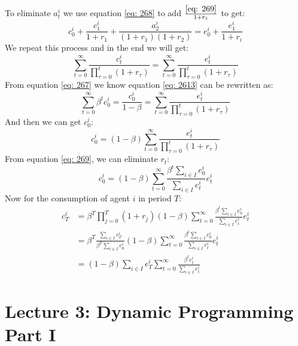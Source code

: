 \documentclass{article}
\begin{document}
To eliminate $a^i_t$ we use equation \eqref{eq: 268} to add $\frac{\eqref{eq: 269}}{1 + r_1}$ to get:
\begin{equation}
	c^i_0 + \frac{c^i_1}{1 + r_1} + \frac{a^i_2}{(1 + r_1)(1 + r_2)} = e^i_0 + \frac{e^i_1}{1 + r_i}
\end{equation} 
We repeat this process and in the end we will get:
\begin{equation}
	\sum\limits^\infty_{t=0} \frac{c^i_t}{\prod\limits^t_{\tau=0}(1 + r_\tau)} = \sum\limits^\infty_{t=0} \frac{e^i_t}{\prod\limits^t_{\tau=0}(1 + r_\tau)} \label{eq: 2613}
\end{equation}
From equation \eqref{eq: 267} we know equation \eqref{eq: 2613} can be rewritten as:
\begin{equation}
	\sum\limits^\infty_{t=0} \beta^t c^i_0 = \frac{c^i_0}{1 - \beta} = \sum\limits^\infty_{t=0} \frac{e^i_t}{\prod\limits^t_{\tau=0}(1 + r_\tau)}
\end{equation}
And then we can get $c^i_0$:
\begin{equation}
	c^i_0 = (1 - \beta) \sum\limits^\infty_{t=0} \frac{e^i_t}{\prod\limits^t_{\tau=0}(1 + r_\tau)}
\end{equation}
From equation \eqref{eq: 269}, we can eliminate $r_t$:
\begin{equation}
	c^i_0 = (1 - \beta) \sum\limits^\infty_{t=0} \frac{\beta^t \sum_{i \in I} e^i_0}{\sum_{i \in I} e^i_t} e^i_t
\end{equation}
Now for the consumption of agent $i$ in period $T$:
\begin{align}
	c^i_T &= \beta^T \prod\limits^T_{j=0} (1 + r_j) (1 - \beta) \sum\limits^\infty_{t=0} \frac{\beta^t \sum_{i \in I} e^i_0}{\sum_{i \in I} e^i_t} e^i_t \nonumber\\
	&= \beta^T \frac{\sum_{i \in I} e^i_T}{\beta^T \sum_{i \in I} e^i_0} (1 - \beta) \sum\limits^\infty_{t=0} \frac{\beta^t \sum_{i \in I} e^i_0}{\sum_{i \in I} e^i_t} e^i_t \nonumber\\
	&= (1 - \beta) \sum_{i \in I} e^i_T \sum\limits^\infty_{t=0} \frac{\beta^t e^i_t}{\sum_{i \in I} e^i_t} 
\end{align}










\newpage
\section{Lecture 3: Dynamic Programming Part I} %
\end{document}
